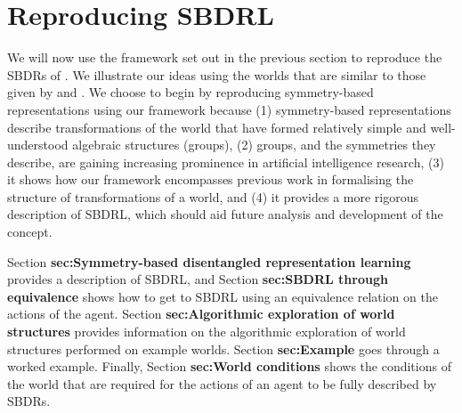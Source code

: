 \section{Reproducing SBDRL}\label{sec:Reproducing SBDRL}

We will now use the framework set out in the previous section to reproduce the SBDRs of \cite{Higgins2018}.
We illustrate our ideas using the worlds that are similar to those given by \cite{Higgins2018} and \cite{caselles2019symmetry}.
We choose to begin by reproducing symmetry-based representations using our framework because (1) symmetry-based representations describe transformations of the world that have formed relatively simple and well-understood algebraic structures (groups), (2) groups, and the symmetries they describe, are gaining increasing prominence in artificial intelligence research, (3) it shows how our framework encompasses previous work in formalising the structure of transformations of a world, and (4) it provides a more rigorous description of SBDRL, which should aid future analysis and development of the concept.

Section \textbf{sec:Symmetry-based disentangled representation learning} provides a description of SBDRL, and Section \textbf{sec:SBDRL through equivalence} shows how to get to SBDRL using an equivalence relation on the actions of the agent.
Section \textbf{sec:Algorithmic exploration of world structures} provides information on the algorithmic exploration of world structures performed on example worlds.
Section \textbf{sec:Example} goes through a worked example.
Finally, Section \textbf{sec:World conditions} shows the conditions of the world that are required for the actions of an agent to be fully described by SBDRs.


